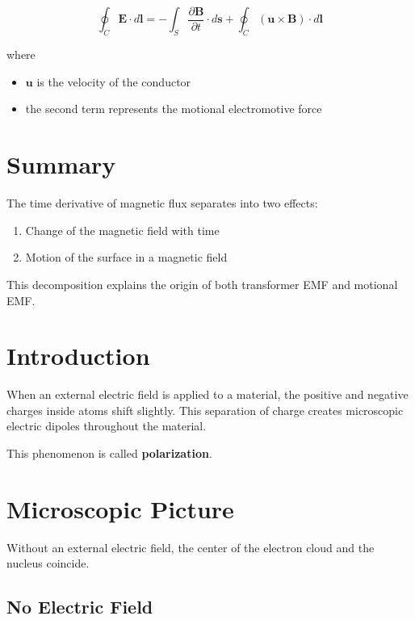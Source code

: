 \documentclass[12pt, a4paper]{article}
\begin{document}
\begin{equation}
\oint_C \mathbf{E}\cdot d\mathbf{l}
=
-
\int_S \frac{\partial \mathbf{B}}{\partial t}\cdot d\mathbf{s}
+
\oint_C (\mathbf{u}\times\mathbf{B})\cdot d\mathbf{l}
\end{equation}

where

\begin{itemize}
\item $\mathbf{u}$ is the velocity of the conductor
\item the second term represents the motional electromotive force
\end{itemize}

\section{Summary}

The time derivative of magnetic flux separates into two effects:

\begin{enumerate}
\item Change of the magnetic field with time
\item Motion of the surface in a magnetic field
\end{enumerate}

This decomposition explains the origin of both transformer EMF and motional EMF.
\section{Introduction}

When an external electric field is applied to a material, the positive and negative charges inside atoms shift slightly. This separation of charge creates microscopic electric dipoles throughout the material.

This phenomenon is called \textbf{polarization}.

\section{Microscopic Picture}

Without an external electric field, the center of the electron cloud and the nucleus coincide.

\subsection{No Electric Field}
\end{document}
